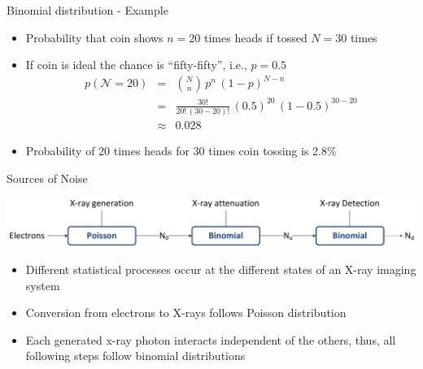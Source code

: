 \begin{frame}{Binomial distribution - Example}
    \begin{itemize}
        \item Probability that coin shows $n=20$ times heads if tossed $N=30$ times
        \item If coin is ideal the chance is ``fifty-fifty'', i.e., $p=0.5$
              \begin{eqnarray}
                  p(\mathcal{N}=20) &=& \binom{N}{n}\,p^n\,(1-p)^{N-n}\nonumber\\[0.4cm]
                  &=&\frac{30!}{20!\,(30-20)!}\,(0.5)^{20}\,(1-0.5)^{30-20}\nonumber\\[0.5cm]
                  &\approx& 0.028\nonumber
                  \label{eq:sdf2}
              \end{eqnarray}
        \item Probability of 20 times heads for 30 times coin tossing is 2.8\%
    \end{itemize}
\end{frame}

\begin{frame}{Sources of Noise}
    \begin{center}
        \includegraphics[width=1\textwidth]{images/NoiseOverview}
    \end{center}
    \begin{itemize}
        \item Different statistical processes occur at the different states of an X-ray imaging system
        \item Conversion from electrons to X-rays follows Poisson distribution
        \item Each generated x-ray photon interacts independent of the others, thus, all following steps follow binomial distributions
    \end{itemize}
\end{frame}

